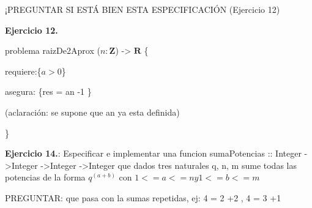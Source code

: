 \documentclass{article}
\begin{document}
\begin{alerta}
¡PREGUNTAR SI ESTÁ BIEN ESTA ESPECIFICACIÓN (Ejercicio 12)
\end{alerta}

\textbf{Ejercicio 12.}

problema raizDe2Aprox ($n: \mathbf{Z}$) -> $\mathbf{R}$ \{

    requiere:\{$a>0$\}

    
    asegura: \{res = an -1 \} 

    (aclaración: se supone que an ya esta definida)


\}

\textbf{Ejercicio 14.}: Especificar e implementar una funcion sumaPotencias :: Integer ->Integer ->Integer ->Integer que dados tres naturales q, n, m sume todas las potencias de la forma $q^(a+b)$ con $1 <= a <= n y 1 <= b <= m$

\begin{alerta}
    PREGUNTAR: que pasa con la sumas repetidas, ej:  4 = 2 +2 , 4 = 3 +1
\end{alerta}
\end{document}
